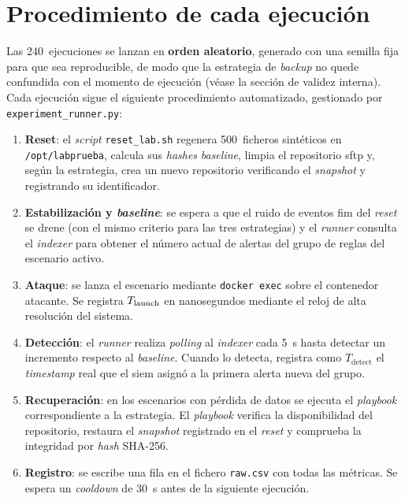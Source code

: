 \documentclass[../main.tex]{subfiles}
\begin{document}
\section{Procedimiento de cada ejecución}
\label{sec:procedimiento}

Las 240~ejecuciones se lanzan en \textbf{orden aleatorio}, generado con una semilla
fija para que sea reproducible, de modo que la estrategia de \emph{backup} no quede
confundida con el momento de ejecución (véase la sección de validez interna). Cada
ejecución sigue el siguiente procedimiento automatizado, gestionado por
\texttt{experiment\_runner.py}:

\begin{enumerate}
  \item \textbf{Reset}: el \emph{script} \texttt{reset\_lab.sh} regenera
  500~ficheros sintéticos en \texttt{/opt/labprueba}, calcula sus \emph{hashes}
  \emph{baseline}, limpia el repositorio \gls{sftp} y, según la estrategia, crea
  un nuevo repositorio \restic verificando el \emph{snapshot} y registrando su
  identificador.

  \item \textbf{Estabilización y \emph{baseline}}: se espera a que el ruido de
  eventos \gls{fim} del \emph{reset} se drene (con el mismo criterio para las tres
  estrategias) y el \emph{runner} consulta el \emph{indexer} para obtener el número
  actual de alertas del grupo de reglas del escenario activo.

  \item \textbf{Ataque}: se lanza el escenario mediante \texttt{docker exec}
  sobre el contenedor atacante. Se registra $T_{\text{launch}}$ en nanosegundos mediante
  el reloj de alta resolución del sistema.

  \item \textbf{Detección}: el \emph{runner} realiza \emph{polling} al
  \emph{indexer} cada 5~s hasta detectar un incremento respecto al \emph{baseline}.
  Cuando lo detecta, registra como $T_{\text{detect}}$ el \emph{timestamp} real que
  el \gls{siem} asignó a la primera alerta nueva del grupo.

  \item \textbf{Recuperación}: en los escenarios con pérdida de datos se ejecuta el
  \emph{playbook} correspondiente a la estrategia. El \emph{playbook} verifica la
  disponibilidad del repositorio, restaura el \emph{snapshot} registrado en el
  \emph{reset} y comprueba la integridad por \emph{hash} SHA-256.

  \item \textbf{Registro}: se escribe una fila en el fichero \texttt{raw.csv}
  con todas las métricas. Se espera un \emph{cooldown} de 30~s antes de la
  siguiente ejecución.
\end{enumerate}
\end{document}
